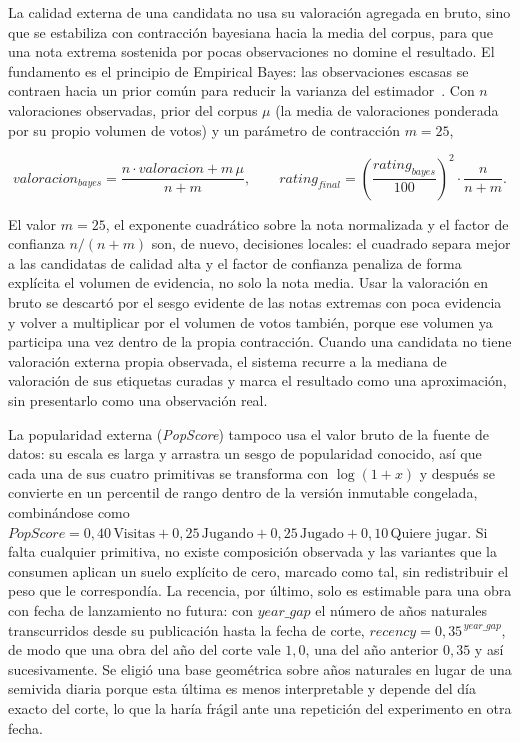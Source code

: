 La calidad externa de una candidata no usa su valoración agregada en bruto, sino que se
estabiliza con contracción bayesiana hacia la media del corpus, para que una
nota extrema sostenida por pocas observaciones no domine el resultado. El fundamento es el
principio de Empirical Bayes: las observaciones escasas se contraen hacia un prior común para
reducir la varianza del estimador~\cite{efron2010large}. Con \(n\) valoraciones observadas,
prior del corpus \(\mu\) (la media de valoraciones ponderada por su propio volumen de votos) y
un parámetro de contracción \(m=25\),

\[
valoracion_{bayes} = \frac{n \cdot valoracion + m\,\mu}{n+m}, \qquad
rating_{final} = \left(\frac{rating_{bayes}}{100}\right)^{2} \cdot \frac{n}{n+m} .
\]

El valor \(m=25\), el exponente cuadrático sobre la nota normalizada y el factor de confianza
\(n/(n+m)\) son, de nuevo, decisiones locales: el cuadrado separa mejor a las candidatas de
calidad alta y el factor de confianza penaliza de forma explícita el volumen de evidencia, no
solo la nota media. Usar la valoración en bruto se descartó por el sesgo evidente de las notas
extremas con poca evidencia y volver a multiplicar por el volumen de votos también, porque ese
volumen ya participa una vez dentro de la propia contracción. Cuando una candidata no tiene
valoración externa propia observada, el sistema recurre a la mediana de valoración de sus
etiquetas curadas y marca el resultado como una aproximación, sin presentarlo como una
observación real.

La popularidad externa (\emph{PopScore}) tampoco usa el valor bruto de la fuente de datos: su
escala es larga y arrastra un sesgo de popularidad conocido, así que cada una de sus cuatro
primitivas se transforma con \(\log(1+x)\) y después se convierte en un percentil de rango
dentro de la versión inmutable congelada, combinándose como \(PopScore = 0{,}40\,\text{Visitas} +
0{,}25\,\text{Jugando} + 0{,}25\,\text{Jugado} + 0{,}10\,\text{Quiere jugar}\). Si falta
cualquier primitiva, no existe composición observada y las variantes que la consumen aplican un
suelo explícito de cero, marcado como tal, sin redistribuir el peso que le correspondía. La
recencia, por último, solo es estimable para una obra con fecha de lanzamiento no futura: con
\(year\_gap\) el número de años naturales transcurridos desde su publicación hasta la fecha de
corte, \(recency = 0{,}35^{\,year\_gap}\), de modo que una obra del año del corte vale
\(1{,}0\), una del año anterior \(0{,}35\) y así sucesivamente. Se eligió una base geométrica
sobre años naturales en lugar de una semivida diaria porque esta última es menos interpretable
y depende del día exacto del corte, lo que la haría frágil ante una repetición del experimento
en otra fecha.

